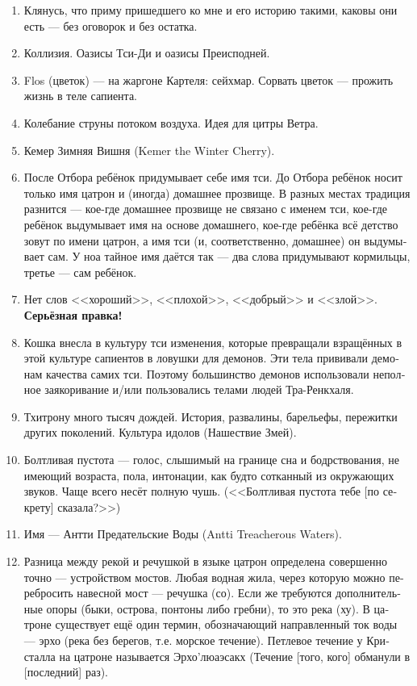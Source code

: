 \documentclass[a4paper,12pt,fleqn]{book}\usepackage{polyglossia}\setdefaultlanguage[babelshorthands=true]{russian}\setotherlanguage{english}\defaultfontfeatures{Ligatures=TeX,Mapping=tex-text}\usepackage{xcolor}\newcommand{\ml}[3]{#2}
\begin{document}
{\begin{enumerate}
\item Клянусь, что приму пришедшего ко мне и его историю такими, каковы они есть --- без оговорок и без остатка.

\item Коллизия. Оазисы Тси-Ди и оазисы Преисподней.

\item Flos (цветок) --- на жаргоне Картеля: сейхмар.
Сорвать цветок --- прожить жизнь в теле сапиента.

\item Колебание струны потоком воздуха.
Идея для цитры Ветра.

\item Кемер Зимняя Вишня (Kemer the Winter Cherry).

\item После Отбора ребёнок придумывает себе имя тси.
До Отбора ребёнок носит только имя цатрон и (иногда) домашнее прозвище.
В разных местах традиция разнится --- кое-где домашнее прозвище не связано с именем тси, кое-где ребёнок выдумывает имя на основе домашнего, кое-где ребёнка всё детство зовут по имени цатрон, а имя тси (и, соответственно, домашнее) он выдумывает сам.
У ноа тайное имя даётся так --- два слова придумывают кормильцы, третье --- сам ребёнок.

\item Нет слов <<хороший>>, <<плохой>>, <<добрый>> и <<злой>>.
\textbf{Серьёзная правка!}

\item Кошка внесла в культуру тси изменения, которые превращали взращённых в этой культуре сапиентов в ловушки для демонов.
Эти тела прививали демонам качества самих тси.
Поэтому большинство демонов использовали неполное заякоривание и/или пользовались телами людей Тра-Ренкхаля.

\item Тхитрону много тысяч дождей.
История, развалины, барельефы, пережитки других поколений.
Культура идолов (Нашествие Змей).

\item Болтливая пустота --- голос, слышимый на границе сна и бодрствования, не имеющий возраста, пола, интонации, как будто сотканный из окружающих звуков.
Чаще всего несёт полную чушь.
(<<Болтливая пустота тебе [по секрету] сказала?>>)

\item Имя --- Антти Предательские Воды (Antti Treacherous Waters).

\item Разница между рекой и речушкой в языке цатрон определена совершенно точно --- устройством мостов.
Любая водная жила, через которую можно перебросить навесной мост --- речушка (со).
Если же требуются дополнительные опоры (быки, острова, понтоны либо гребни), то это река (ху).
В цатроне существует ещё один термин, обозначающий направленный ток воды --- эрхо (река без берегов, т.е. морское течение).
Петлевое течение у Кристалла на цатроне называется Эрхо'люаэсакх (Течение [того, кого] обманули в [последний] раз).


\end{enumerate}}
\end{document}
